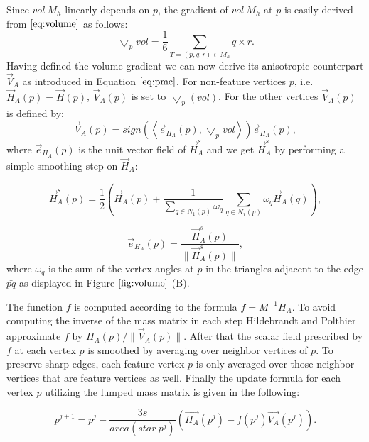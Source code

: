 \documentclass[11pt]{article}
\begin{document}
Since $vol \ M_h$ linearly depends on $p$, the gradient of $vol \ M_h$ at $p$ is easily derived from $\ref{eq:volume}$ as follows:
\begin{equation}
\bigtriangledown_p vol = \frac{1}{6}\sum\limits_{T=(p, q, r) \in M_h}q \times r.
\end{equation}
Having defined the volume gradient we can now derive its anisotropic counterpart $\vec{V}_A$ as introduced in Equation $\ref{eq:pmc}$. For non-feature vertices $p$, i.e. $\vec{H}_A(p) = \vec{H}(p)$, $\vec{V}_A(p)$ is set to $\bigtriangledown_p(vol)$. For the other vertices $\vec{V}_A(p)$ is defined by:
\begin{equation}
\vec{V}_A(p) = sign\left( \left\langle \vec{e}_{H_A}(p), \bigtriangledown_p vol\right\rangle \right) \vec{e}_{H_A}(p),
\end{equation}
where $\vec{e}_{H_A}(p)$ is the unit vector field of $\vec{H}^s_A$ and we get $\vec{H}^s_A$ by performing a simple smoothing step on $\vec{H}_A$:

\begin{equation}
\vec{H}^s_A(p) = \frac{1}{2}\left( \vec{H}_A(p) + \dfrac{1}{\sum\limits_{q \in N_1(p)} \omega_q}\sum\limits_{q \in N_1(p)}\omega_q\vec{H}_A(q) \right) ,
\end{equation}

\begin{equation}
\vec{e}_{H_A}(p) = \dfrac{\vec{H}^s_A(p)}{\parallel \vec{H}^s_A(p) \parallel},
\end{equation}
where $\omega_q$ is the sum of the vertex angles at $p$ in the triangles adjacent to the edge $\bar{pq}$ as displayed in Figure $\ref{fig:volume}$ (B).

The function $f$ is computed according to the formula $f = M^{-1}H_A$. To avoid computing the inverse of the mass matrix in each step Hildebrandt and Polthier \cite{Hildebrandt04anisotropicfiltering} approximate $f$ by $H_A(p)/\parallel \vec{V}_A(p) \parallel$. After that the scalar field prescribed by $f$ at each vertex $p$ is smoothed by averaging over neighbor vertices of $p$. To preserve sharp edges, each feature vertex $p$ is only averaged over those neighbor vertices that are feature vertices as well. Finally the update formula for each vertex $p$ utilizing the lumped mass matrix is given in the following:

\begin{equation}
p^{j+1} = p^{j} - \dfrac{3s}{area(star\ p^j)}(\vec{H_A}(p^j) - f(p^j)\vec{V_A}(p^j)).
\end{equation}
\end{document}
